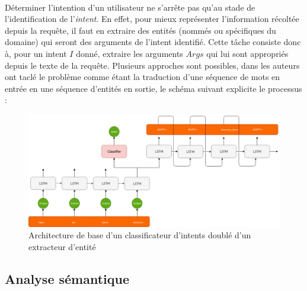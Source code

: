 		\paragraph{}
		Déterminer l'intention d'un utilisateur ne s'arrête pas qu'au stade de l'identification de l'\textit{intent}. En effet, pour mieux représenter l'information récoltée depuis la requête, il faut en extraire des entités (nommés ou spécifiques du domaine) qui seront des arguments de l'intent identifié. Cette tâche consiste donc à, pour un intent $I$ donné, extraire les arguments $Args$ qui lui sont appropriés depuis le texte de la requête. Plusieurs approches sont possibles, dans \cite{intent_slots} les auteurs ont taclé le problème comme étant la traduction d'une séquence de mots en entrée en une séquence d'entités en sortie, le schéma suivant explicite le processus :
		\begin{figure}[H]
			\centering
			\includegraphics[width=0.85\linewidth]{images/NLU/seq2seq.png}
			\caption{Architecture de base d'un classificateur d'intents doublé d'un extracteur d'entité \cite{intent_slots}}
			\label{fig:lstmslots}
		\end{figure} 
	\subsection{Analyse sémantique}

